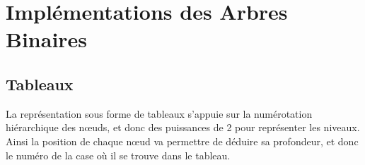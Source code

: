 \documentclass[11pt,a4paper]{article}
\begin{document}
%


\pagebreak

\section{Implémentations des Arbres Binaires}

\bigskip

\subsection{Tableaux}

La représentation sous forme de tableaux s'appuie sur la numérotation hiérarchique des nœuds, et donc des puissances de 2 pour représenter les niveaux.
Ainsi la position de chaque nœud va permettre de déduire sa profondeur, et donc le numéro de la case où il se trouve dans le tableau.
\end{document}
